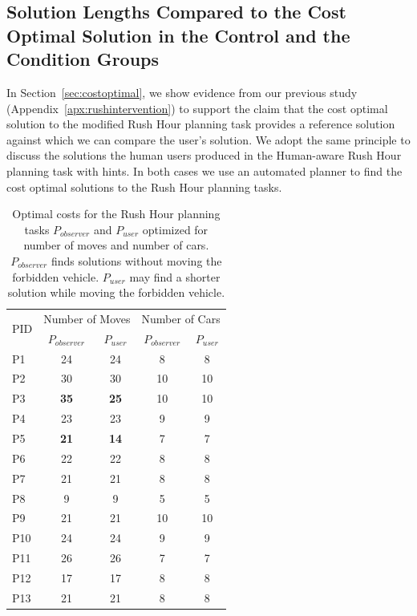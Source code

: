 \subsection{Solution Lengths Compared to the Cost Optimal Solution in the Control and the Condition Groups}
In Section~\ref{sec:costoptimal}, we show evidence from our previous study (Appendix~\ref{apx:rushintervention}) to support the claim that the cost optimal solution to the modified Rush Hour planning task provides a reference solution against which we can compare the user’s solution.
We adopt the same principle to discuss the solutions the human users produced in the Human-aware Rush Hour planning task with hints.
In both cases we use an automated planner to find the cost optimal solutions to the Rush Hour planning tasks.

\begin{table}[tpb]
\begin{tabular}{|l|c|c|c|c|}
\hline
\multirow{2}{*}{PID} & \multicolumn{2}{l|}{Number of Moves} & \multicolumn{2}{l|}{Number of Cars} \\ \cline{2-5} 
    & $P_{observer}$ & $P_{user}$ & $P_{observer}$ & $P_{user}$ \\ \hline
P1  & 24   & 24     & 8    & 8      \\ 
P2  & 30   & 30     & 10   & 10     \\ 
P3  & \textbf{35}   & \textbf{25}     & 10   & 10     \\ 
P4  & 23   & 23     & 9    & 9      \\ 
P5  & \textbf{21}   & \textbf{14}     & 7    & 7      \\ 
P6  & 22   & 22     & 8    & 8      \\ 
P7  & 21   & 21     & 8    & 8      \\ 
P8  & 9    & 9      & 5    & 5      \\ 
P9  & 21   & 21     & 10   & 10     \\
P10 & 24   & 24     & 9    & 9      \\ 
P11 & 26   & 26     & 7	   & 7		\\
P12 & 17   & 17     & 8    & 8		\\
P13 & 21   & 21	    & 8	   & 8		\\	\hline
\end{tabular}
\caption{Optimal costs for the Rush Hour planning tasks $P_{observer}$ and $P_{user}$ optimized for number of moves and number of cars. $P_{observer}$ finds solutions without moving the forbidden vehicle. $P_{user}$ may find a shorter solution while moving the forbidden vehicle.}
\label{tab:optimals}
\end{table}

